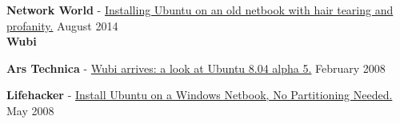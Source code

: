 \textbf{Network World} - \href{https://www.networkworld.com/article/2465150/installing-ubuntu-on-an-old-netbook-with-hair-tearing-and-profanity.html}{Installing Ubuntu on an old netbook with hair tearing and profanity.} \hfill August 2014\\



\textcolor{sectcol}{\textbf{Wubi}}

\textbf{Ars Technica} - \href{https://arstechnica.com/information-technology/2008/02/wubi-arrives-a-look-at-ubuntu-8-04-alpha-5/}{Wubi arrives: a look at Ubuntu 8.04 alpha 5.} \hfill February 2008


\textbf{Lifehacker} - \href{https://lifehacker.com/install-ubuntu-on-a-windows-netbook-no-partitioning-ne-5542387}{Install Ubuntu on a Windows Netbook, No Partitioning Needed.} \hfill May 2008


